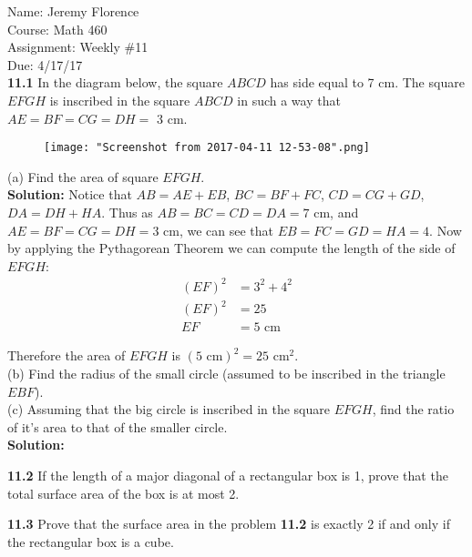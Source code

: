 \documentclass{article}
\newcounter{problem}
\newcommand\TheSolution{%
  \textbf{Solution:} %
}
\begin{document}
Name: Jeremy Florence\\
Course: Math 460\\
Assignment: Weekly \#11\\
Due: 4/17/17\\

\textbf{11.1} In the diagram below, the square $ABCD$ has side equal to 7 cm. The square $EFGH$ is inscribed in the square $ABCD$ in such a way that $AE=BF=CG=DH=$ 3 cm.

\begin{figure}[htp]
\texttt{[image: "Screenshot from 2017-04-11 12-53-08".png]}
\end{figure}


(a) Find the area of square $EFGH$.\\

\TheSolution Notice that $AB=AE+EB$, $BC=BF+FC$, $CD=CG+GD$, $DA=DH+HA$. Thus as $AB=BC=CD=DA=7$ cm, and $AE=BF=CG=DH=3$ cm, we can see that $EB=FC=GD=HA=4$. Now by applying the Pythagorean Theorem we can compute the length of the side of $EFGH$:
\[
	\begin{split}
	(EF)^2 &= 3^2+4^2\\
	(EF)^2 &= 25\\
		EF &= 5 \text{ cm}
	\end{split}
\]

Therefore the area of $EFGH$ is $(5 \text{ cm})^2=25$ cm$^2$.\\

(b) Find the radius of the small circle (assumed to be inscribed in the triangle $EBF$).\\
(c) Assuming that the big circle is inscribed in the square $EFGH$, find the ratio of it's area to that of the smaller circle.\\

\TheSolution

\textbf{11.2} If the length of a major diagonal of a rectangular box is 1, prove that the total surface area of the box is at most 2.

\textbf{11.3} Prove that the surface area in the problem \textbf{11.2} is exactly 2 if and only if the rectangular box is a cube.
\end{document}
